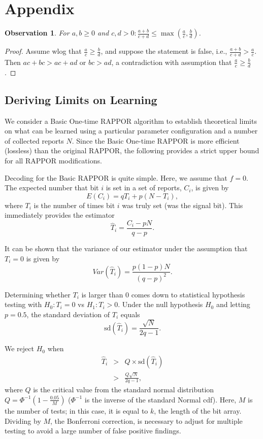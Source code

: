 \documentclass{sig-alternate-2013}
\newtheorem{obs}{Observation}
\newcommand\RAPPOR{{RAPPOR}}
\begin{document}





\section*{Appendix}
\begin{obs}\label{obs-ratios}
For $a, b \geq 0$ and $c, d > 0: \frac{a+b}{c+d} \leq \max(\frac{a}{c}, \frac{b}{d})$.
\end{obs}
\begin{proof} 
Assume wlog that $\frac{a}{c} \geq \frac{b}{d}$, and suppose the statement is false, i.e., $\frac{a+b}{c+d} > \frac{a}{c}$. Then $ac + bc > ac + ad$ or $bc > ad$, a contradiction with assumption that $\frac{a}{c} \geq \frac{b}{d}$.
\end{proof}

\subsection*{Deriving Limits on Learning}
We consider a Basic One-time \RAPPOR{} algorithm to establish theoretical limits on what can be learned using a particular parameter configuration and a number of collected reports $N$. Since the Basic One-time  \RAPPOR{} is more efficient (lossless) than the original \RAPPOR{}, the following provides a strict upper bound for all \RAPPOR{} modifications.

\vfill\eject

Decoding for the Basic \RAPPOR{} is quite simple. Here, we assume that $f = 0$. The expected number that bit $i$ is set in a set of reports, $C_i$, is given by
$$
E(C_i) = qT_i + p(N - T_i),
$$
where $T_i$ is the number of times bit $i$ was truly set (was the signal bit). This immediately provides the estimator
$$
\hat{T}_i = \frac{C_i - pN}{q - p}.
$$


It can be shown that the variance of our estimator under the assumption that $T_i = 0$ is given by
$$
Var(\hat{T}_i) = \frac{p(1 - p)N}{(q - p)^2}.
$$

Determining whether $T_i$ is larger than 0 comes down to statistical hypothesis testing with $H_0: T_i = 0$ vs $H_1: T_i > 0$. Under the null hypothesis $H_0$ and letting $p = 0.5$, the standard deviation of $T_i$ equals
$$
\text{sd}(\hat{T}_i) = \frac{\sqrt{N}}{2q - 1}.
$$

We reject $H_0$ when
\begin{eqnarray*}
\hat{T}_i & > & Q \times \text{sd}(\hat{T}_i) \\
          & > & \frac{Q\sqrt{N}}{2q - 1},
\end{eqnarray*}
where $Q$ is the critical value from the standard normal distribution $Q = \Phi^{-1}(1 - \frac{0.05}{M})$ ($\Phi^{-1}$ is the inverse of the standard Normal cdf). Here, $M$ is the number of tests; in this case, it is equal to $k$, the length of the bit array. Dividing by $M$, the Bonferroni correction, is necessary to adjust for multiple testing to avoid a large number of false positive findings.
\end{document}
